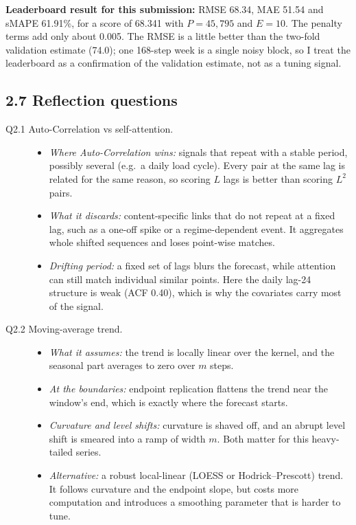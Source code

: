 \textbf{Leaderboard result for this submission:} RMSE 68.34, MAE 51.54 and sMAPE 61.91\%, for a score of 68.341 with $P=45{,}795$ and $E=10$. The penalty terms add only about 0.005. The RMSE is a little better than the two-fold validation estimate (74.0); one 168-step week is a single noisy block, so I treat the leaderboard as a confirmation of the validation estimate, not as a tuning signal.

\subsection*{2.7 Reflection questions}
\begin{description}
\item[Q2.1 Auto-Correlation vs self-attention.]
\begin{itemize}
\item \emph{Where Auto-Correlation wins:} signals that repeat with a stable period, possibly several (e.g.\ a daily load cycle). Every pair at the same lag is related for the same reason, so scoring $L$ lags is better than scoring $L^2$ pairs.
\item \emph{What it discards:} content-specific links that do not repeat at a fixed lag, such as a one-off spike or a regime-dependent event. It aggregates whole shifted sequences and loses point-wise matches.
\item \emph{Drifting period:} a fixed set of lags blurs the forecast, while attention can still match individual similar points. Here the daily lag-24 structure is weak (ACF 0.40), which is why the covariates carry most of the signal.
\end{itemize}

\item[Q2.2 Moving-average trend.]
\begin{itemize}
\item \emph{What it assumes:} the trend is locally linear over the kernel, and the seasonal part averages to zero over $m$ steps.
\item \emph{At the boundaries:} endpoint replication flattens the trend near the window's end, which is exactly where the forecast starts.
\item \emph{Curvature and level shifts:} curvature is shaved off, and an abrupt level shift is smeared into a ramp of width $m$. Both matter for this heavy-tailed series.
\item \emph{Alternative:} a robust local-linear (LOESS or Hodrick--Prescott) trend. It follows curvature and the endpoint slope, but costs more computation and introduces a smoothing parameter that is harder to tune.
\end{itemize}


\end{description}
